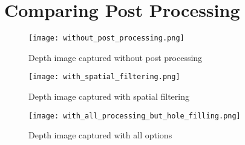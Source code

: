 
\section{Comparing Post Processing}
\begin{figure}[h]
\centering
\texttt{[image: without\_post\_processing.png]}
\caption{Depth image captured without post processing}

\texttt{[image: with\_spatial\_filtering.png]}
\caption{Depth image captured with spatial filtering}

\texttt{[image: with\_all\_processing\_but\_hole\_filling.png]}
\caption{Depth image captured with all options}
\end{figure}
